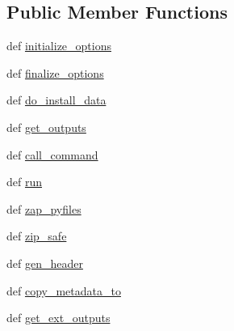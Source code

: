 \subsection*{Public Member Functions}
\begin{DoxyCompactItemize}
\item 
def \hyperlink{classsetuptools_1_1command_1_1bdist__egg_1_1bdist__egg_a9d4bab6890f5a8caa65014c6881289f8}{initialize\+\_\+options}
\item 
def \hyperlink{classsetuptools_1_1command_1_1bdist__egg_1_1bdist__egg_ac97af905798eec1a904b7d17e0c43ab7}{finalize\+\_\+options}
\item 
def \hyperlink{classsetuptools_1_1command_1_1bdist__egg_1_1bdist__egg_a08cfcceb5b8f76f3b46ca35b7502f888}{do\+\_\+install\+\_\+data}
\item 
def \hyperlink{classsetuptools_1_1command_1_1bdist__egg_1_1bdist__egg_a32715ad90fa39affce4d8d75039aef96}{get\+\_\+outputs}
\item 
def \hyperlink{classsetuptools_1_1command_1_1bdist__egg_1_1bdist__egg_a188b22a704d5c3165192a33c07ce87b0}{call\+\_\+command}
\item 
def \hyperlink{classsetuptools_1_1command_1_1bdist__egg_1_1bdist__egg_a508c25d12280b7d13a4e45bef69d41a7}{run}
\item 
def \hyperlink{classsetuptools_1_1command_1_1bdist__egg_1_1bdist__egg_a63572e244a3c3b3ee535c1cae70a148e}{zap\+\_\+pyfiles}
\item 
def \hyperlink{classsetuptools_1_1command_1_1bdist__egg_1_1bdist__egg_ae2ba96ed51d825a16cb67a79ff15fc66}{zip\+\_\+safe}
\item 
def \hyperlink{classsetuptools_1_1command_1_1bdist__egg_1_1bdist__egg_ab638513627840525eaa230e11f001e87}{gen\+\_\+header}
\item 
def \hyperlink{classsetuptools_1_1command_1_1bdist__egg_1_1bdist__egg_a0042ea19a645bd943b92e986aa1216dc}{copy\+\_\+metadata\+\_\+to}
\item 
def \hyperlink{classsetuptools_1_1command_1_1bdist__egg_1_1bdist__egg_a6f371dd4034723a76216c8f3b8d18e73}{get\+\_\+ext\+\_\+outputs}
\end{DoxyCompactItemize}
